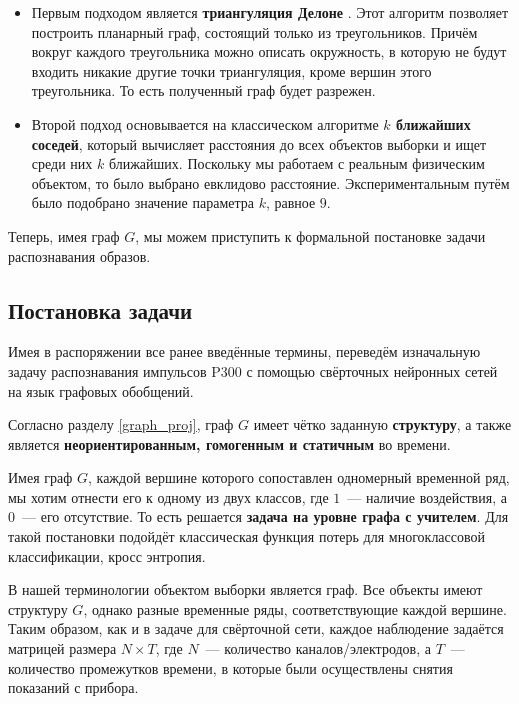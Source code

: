 \documentclass[12pt]{article}
\begin{document}
\begin{itemize}
    \item Первым подходом является \textbf{триангуляция Делоне} \cite{delaunay1934sphere}. Этот алгоритм позволяет построить планарный граф, состоящий только из треугольников. Причём вокруг каждого треугольника можно описать окружность, в которую не будут входить никакие другие точки триангуляция, кроме вершин этого треугольника. То есть полученный граф будет разрежен.
    
    \item Второй подход основывается на классическом алгоритме \textbf{$k$ ближайших соседей}, который вычисляет расстояния до всех объектов выборки и ищет среди них $k$ ближайших. Поскольку мы работаем с реальным физическим объектом, то было выбрано евклидово расстояние. Экспериментальным путём было подобрано значение параметра $k$, равное $9$.
\end{itemize}

Теперь, имея граф $G$, мы можем приступить к формальной постановке задачи распознавания образов.
    
\subsection{Постановка задачи}

Имея в распоряжении все ранее введённые термины, переведём изначальную задачу распознавания импульсов P300 с помощью свёрточных нейронных сетей на язык графовых обобщений. 

Согласно разделу \ref{graph_proj}, граф $G$ имеет чётко заданную \textbf{структуру}, а также является \textbf{неориентированным, гомогенным и статичным} во времени. 

Имея граф $G$, каждой вершине которого сопоставлен одномерный временной ряд, мы хотим отнести его к одному из двух классов, где $1$~--- наличие воздействия, а $0$~--- его отсутствие. То есть решается \textbf{задача на уровне графа с учителем}. Для такой постановки подойдёт классическая функция потерь для многоклассовой классификации, кросс энтропия.

В нашей терминологии объектом выборки является граф. Все объекты имеют структуру $G$, однако разные временные ряды, соответствующие каждой вершине. Таким образом, как и в задаче для свёрточной сети, каждое наблюдение задаётся матрицей размера $N \times T$, где $N$~--- количество каналов/электродов, а $T$~--- количество промежутков времени, в которые были осуществлены снятия показаний с прибора.
\end{document}
